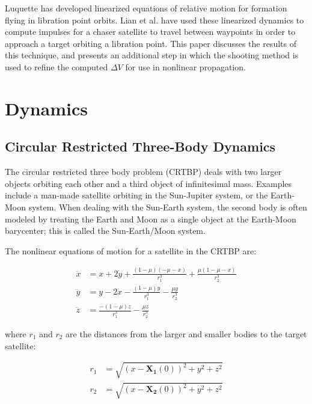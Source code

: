\documentclass[]{article}
\begin{document}
Luquette has developed linearized equations of relative motion for formation flying in libration point orbits.  Lian et al. have used these linearized dynamics to compute impulses for a chaser satellite to travel between waypoints in order to approach a target orbiting a libration point.  This paper discusses the results of this technique, and presents an additional step in which the shooting method is used to refine the computed \(\Delta V\) for use in nonlinear propagation.

\section{Dynamics}

\subsection{Circular Restricted Three-Body Dynamics}
The circular restricted three body problem (CRTBP) deals with two larger objects orbiting each other and a third object of infinitesimal mass.  Examples include a man-made satellite orbiting in the Sun-Jupiter system, or the Earth-Moon system.  When dealing with the Sun-Earth system, the second body is often modeled by treating the Earth and Moon as a single object at the Earth-Moon barycenter; this is called the Sun-Earth/Moon system.

The nonlinear equations of motion for a satellite in the CRTBP are:

\begin{equation} \label{eq:CRTBP}
\begin{aligned}
\ddot{x} &= x + 2\dot{y} + \frac{(1 - \mu)(-\mu - x)}{r_1^3} + \frac{\mu(1 - \mu - x)}{r_2^3} \\
\ddot{y} &= y - 2\dot{x} - \frac{(1 - \mu)y}{r_1^3} - \frac{\mu y}{r_2^3} \\
\ddot{z} &= \frac{-(1 - \mu)z}{r_1^3} - \frac{\mu z}{r_2^3}
\end{aligned}
\end{equation}

where \(r_1\) and \(r_2\) are the distances from the larger and smaller bodies to the target satellite:

\begin{equation*}
\begin{aligned}
r_1 &= \sqrt{(x-\mathbf{X_1}(0))^2 + y^2 + z^2} \\
r_2 &= \sqrt{(x-\mathbf{X_2}(0))^2 + y^2 + z^2}
\end{aligned}
\end{equation*}
\end{document}
